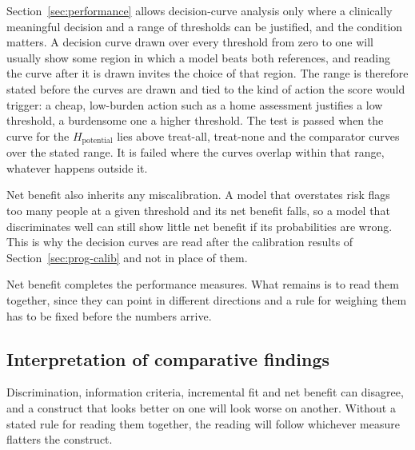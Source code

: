 Section~\ref{sec:performance} allows decision-curve analysis only where a clinically meaningful decision and a range of thresholds can be justified, and the condition matters. A decision curve drawn over every threshold from zero to one will usually show some region in which a model beats both references, and reading the curve after it is drawn invites the choice of that region. The range is therefore stated before the curves are drawn and tied to the kind of action the score would trigger: a cheap, low-burden action such as a home assessment justifies a low threshold, a burdensome one a higher threshold. The test is passed when the curve for the $H_{\text{potential}}$ lies above treat-all, treat-none and the comparator curves over the stated range. It is failed where the curves overlap within that range, whatever happens outside it.

Net benefit also inherits any miscalibration. A model that overstates risk flags too many people at a given threshold and its net benefit falls, so a model that discriminates well can still show little net benefit if its probabilities are wrong. This is why the decision curves are read after the calibration results of Section~\ref{sec:prog-calib} and not in place of them.

\medskip
{}

\medskip
\noindent Net benefit completes the performance measures. What remains is to read them together, since they can point in different directions and a rule for weighing them has to be fixed before the numbers arrive.

\subsection{Interpretation of comparative findings}
\label{sec:prog-interp}

\noindent Discrimination, information criteria, incremental fit and net benefit can disagree, and a construct that looks better on one will look worse on another. Without a stated rule for reading them together, the reading will follow whichever measure flatters the construct.

